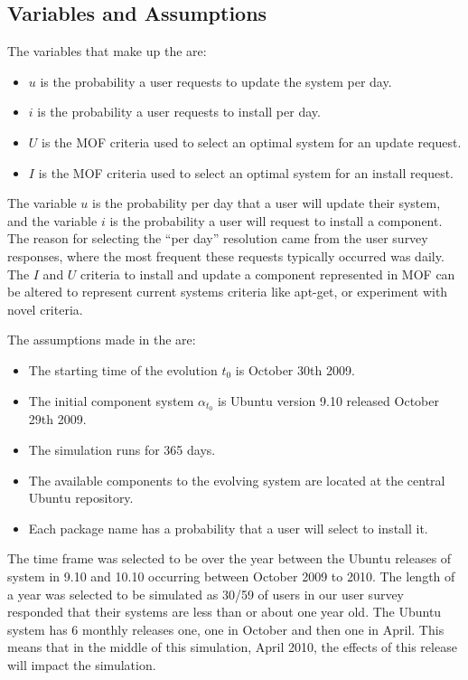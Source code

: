 \subsection{Variables and Assumptions}
The variables that make up the \usermodel are: 
\begin{itemize}
  \item $u$ is the probability a user requests to update the system per day.
  \item $i$ is the probability a user requests to install per day.
  \item $U$ is the MOF criteria used to select an optimal system for an update request.
  \item $I$ is the MOF criteria used to select an optimal system for an install request.
\end{itemize}

The variable $u$ is the probability per day that a user will update their system, and the variable $i$ is the probability a user will request to install a component.
The reason for selecting the ``per day'' resolution came from the user survey responses, where the most frequent these requests typically occurred was daily.
The $I$ and $U$ criteria to install and update a component represented in MOF can be altered to represent current systems criteria like apt-get,
or experiment with novel criteria.

The assumptions made in the \usermodel are:
\begin{itemize}
  \item The starting time of the evolution $t_0$ is October 30th 2009.
  \item The initial component system $\alpha_{t_0}$ is Ubuntu version 9.10 released October 29th 2009.
  \item The simulation runs for 365 days.
  \item The available components to the evolving system are located at the central Ubuntu repository.
  \item Each package name has a probability that a user will select to install it. 
\end{itemize}

The time frame was selected to be over the year between the Ubuntu releases of system in 9.10 and 10.10 occurring between October 2009 to 2010.
The length of a year was selected to be simulated as 30/59 of users in our user survey responded that their systems are less than or about one year old.
The Ubuntu system has 6 monthly releases one, one in October and then one in April.
This means that in the middle of this simulation, April 2010, the effects of this release will impact the simulation.

